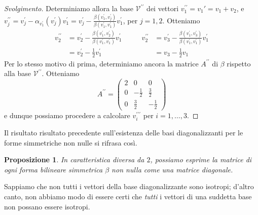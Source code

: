\documentclass[a4paper]{amsproc}
\theoremstyle{plain}
\newtheorem{prp}{Proposizione}[section]
\theoremstyle{definition}
\theoremstyle{remark}
\begin{document}
\begin{proof}[Svolgimento]
  Determiniamo allora la base $ \mathcal V^{\prime\prime} $ dei vettori $ v_1^{\prime\prime} = v_1\prime = v_1 + v_2 $, e $ v_j^{\prime\prime} = v_j^\prime - \alpha_{v_1^\prime}(v_j^\prime)v_1^\prime = v_j^\prime - \frac{\beta(v_1^\prime,v_j^\prime)}{\beta(v_1^\prime,v_1^\prime)}v_1^\prime $, per $ j = 1,2 $. Otteniamo
  \[
    \begin{aligned}
      v_2^{\prime\prime} &= v_2^\prime - \frac{\beta(v_1^\prime,v_2^\prime)}{\beta(v_1^\prime,v_1^\prime)}v_1^\prime\\
      &= v_2^\prime - \frac12 v_1^\prime
    \end{aligned}%
    \qquad%
    \begin{aligned}
      v_2^{\prime\prime} &= v_3^\prime - \frac{\beta(v_1^\prime,v_3^\prime)}{\beta(v_1^\prime,v_1^\prime)}v_1^\prime\\
      &= v_3 - \frac12 v_1
    \end{aligned}%
  \]
  Per lo stesso motivo di prima, determiniamo ancora la matrice $ A^{\prime\prime} $ di $ \beta $ rispetto alla base $ \mathcal V^{\prime\prime} $. Otteniamo
  \[
    A^{\prime\prime} =%
    \left(%
      \begin{smallmatrix}
        2 & 0 & 0\\
        0 & -\frac12 & \frac32\\
        0 & \frac32 & -\frac12
      \end{smallmatrix}
    \right)
  \]
  e dunque possiamo procedere a calcolare $ v_i^{\prime\prime\prime} $ per $ i = 1,\dots,3 $.
\end{proof}

Il risultato risultato precedente sull'esistenza delle basi diagonalizzanti per le forme simmetriche non nulle si rifrasa così.

\begin{prp}
  In caratteristica diversa da $ 2 $, possiamo esprime la matrice di ogni forma bilineare simmetrica $ \beta $ non nulla come una matrice diagonale.
\end{prp}

Sappiamo che non tutti i vettori della base diagonalizzante sono isotropi; d'altro canto, non abbiamo modo di essere certi che \emph{tutti} i vettori di una suddetta base non possano essere isotropi.
\end{document}
